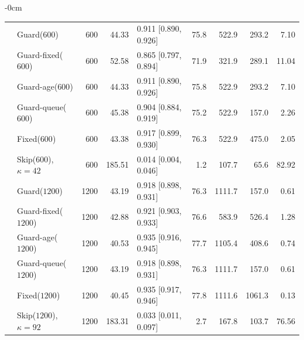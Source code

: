 \documentclass[mathematics,supfile,submit,moreauthors]{Definitions/mdpi}
\newcommand{\sealednum}[1]{#1}
\begin{document}
\begin{table}[htbp]
\begin{adjustwidth}{-\extralength}{0cm}
\begin{tabular}{llrrlrrrr}
 & Guard($\sealednum{600}$)      & \sealednum{600} & \sealednum{44.33} & \sealednum{0.911 [0.890, 0.926]} & \sealednum{75.8} & \sealednum{522.9} & \sealednum{293.2} & \sealednum{7.10} \\
 & Guard-fixed($\sealednum{600}$) & \sealednum{600} & \sealednum{52.58} & \sealednum{0.865 [0.797, 0.894]} & \sealednum{71.9} & \sealednum{321.9} & \sealednum{289.1} & \sealednum{11.04} \\
 & Guard-age($\sealednum{600}$)  & \sealednum{600} & \sealednum{44.33} & \sealednum{0.911 [0.890, 0.926]} & \sealednum{75.8} & \sealednum{522.9} & \sealednum{293.2} & \sealednum{7.10} \\
 & Guard-queue($\sealednum{600}$) & \sealednum{600} & \sealednum{45.38} & \sealednum{0.904 [0.884, 0.919]} & \sealednum{75.2} & \sealednum{522.9} & \sealednum{157.0} & \sealednum{2.26} \\
 & Fixed($\sealednum{600}$)      & \sealednum{600} & \sealednum{43.38} & \sealednum{0.917 [0.899, 0.930]} & \sealednum{76.3} & \sealednum{522.9} & \sealednum{475.0} & \sealednum{2.05} \\
 & Skip($\sealednum{600}$), $\kappa=42$ & \sealednum{600} & \sealednum{185.51} & \sealednum{0.014 [0.004, 0.046]} & \sealednum{1.2} & \sealednum{107.7} & \sealednum{65.6} & \sealednum{82.92} \\
 & Guard($\sealednum{1200}$)     & \sealednum{1200} & \sealednum{43.19} & \sealednum{0.918 [0.898, 0.931]} & \sealednum{76.3} & \sealednum{1111.7} & \sealednum{157.0} & \sealednum{0.61} \\
 & Guard-fixed($\sealednum{1200}$) & \sealednum{1200} & \sealednum{42.88} & \sealednum{0.921 [0.903, 0.933]} & \sealednum{76.6} & \sealednum{583.9} & \sealednum{526.4} & \sealednum{1.28} \\
 & Guard-age($\sealednum{1200}$) & \sealednum{1200} & \sealednum{40.53} & \sealednum{0.935 [0.916, 0.945]} & \sealednum{77.7} & \sealednum{1105.4} & \sealednum{408.6} & \sealednum{0.74} \\
 & Guard-queue($\sealednum{1200}$) & \sealednum{1200} & \sealednum{43.19} & \sealednum{0.918 [0.898, 0.931]} & \sealednum{76.3} & \sealednum{1111.7} & \sealednum{157.0} & \sealednum{0.61} \\
 & Fixed($\sealednum{1200}$)     & \sealednum{1200} & \sealednum{40.45} & \sealednum{0.935 [0.917, 0.946]} & \sealednum{77.8} & \sealednum{1111.6} & \sealednum{1061.3} & \sealednum{0.13} \\
 & Skip($\sealednum{1200}$), $\kappa=92$ & \sealednum{1200} & \sealednum{183.31} & \sealednum{0.033 [0.011, 0.097]} & \sealednum{2.7} & \sealednum{167.8} & \sealednum{103.7} & \sealednum{76.56} \\
\bottomrule
\end{tabular}
\end{adjustwidth}
\end{table}
\end{document}
